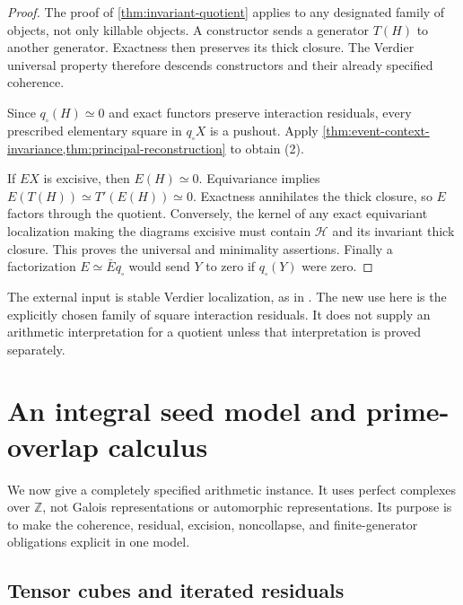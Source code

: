 \documentclass[11pt]{article}
\theoremstyle{definition}
\theoremstyle{remark}
\begin{document}
\begin{proof}
The proof of \cref{thm:invariant-quotient} applies to any designated family of objects, not only killable objects. A constructor sends a generator $T(H)$ to another generator. Exactness then preserves its thick closure. The Verdier universal property therefore descends constructors and their already specified coherence.

Since $q_{\square}(H)\simeq0$ and exact functors preserve interaction residuals, every prescribed elementary square in $q_{\square}X$ is a pushout. Apply \cref{thm:event-context-invariance,thm:principal-reconstruction} to obtain (2).

If $EX$ is excisive, then $E(H)\simeq0$. Equivariance implies $E(T(H))\simeq T'(E(H))\simeq0$. Exactness annihilates the thick closure, so $E$ factors through the quotient. Conversely, the kernel of any exact equivariant localization making the diagrams excisive must contain $\mathscr H$ and its invariant thick closure. This proves the universal and minimality assertions. Finally a factorization $E\simeq\bar E q_{\square}$ would send $Y$ to zero if $q_{\square}(Y)$ were zero.
\end{proof}

The external input is stable Verdier localization, as in \cite{Drew2015,StacksVerdier}. The new use here is the explicitly chosen family of square interaction residuals. It does not supply an arithmetic interpretation for a quotient unless that interpretation is proved separately.

\section{An integral seed model and prime-overlap calculus}\label{sec:integral-model}

We now give a completely specified arithmetic instance. It uses perfect complexes over $\mathbb Z$, not Galois representations or automorphic representations. Its purpose is to make the coherence, residual, excision, noncollapse, and finite-generator obligations explicit in one model.

\subsection{Tensor cubes and iterated residuals}
\end{document}
